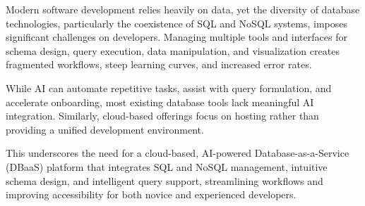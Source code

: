 
Modern software development relies heavily on data, yet the diversity of database technologies, particularly the coexistence of SQL and NoSQL systems, imposes significant challenges on developers. Managing multiple tools and interfaces for schema design, query execution, data manipulation, and visualization creates fragmented workflows, steep learning curves, and increased error rates.

While AI can automate repetitive tasks, assist with query formulation, and accelerate onboarding, most existing database tools lack meaningful AI integration. Similarly, cloud-based offerings focus on hosting rather than providing a unified development environment.

This underscores the need for a cloud-based, AI-powered Database-as-a-Service (DBaaS) platform that integrates SQL and NoSQL management, intuitive schema design, and intelligent query support, streamlining workflows and improving accessibility for both novice and experienced developers.